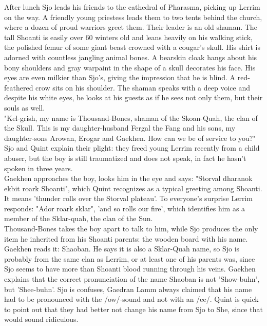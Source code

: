 After lunch Sjo leads his friends to the cathedral of Pharasma, picking up Lerrim on the way. A friendly young priestess leads them to two tents behind the church, where a dozen of proud warriors greet them. Their leader is an old shaman. The tall Shoanti is easily over 60 winters old and leans heavily on his walking stick, the polished femur of some giant beast crowned with a cougar's skull. His shirt is adorned with countless jangling animal bones. A bearskin cloak hangs about his bony shoulders and gray warpaint in the shape of a skull decorates his face. His eyes are even milkier than Sjo's, giving the impression that he is blind. A red-feathered crow sits on his shoulder. The shaman speaks with a deep voice and despite his white eyes, he looks at his guests as if he sees not only them, but their souls as well.\\

"Kel-grish, my name is Thousand-Bones, shaman of the Skoan-Quah, the clan of the Skull. This is my daughter-husband Fergal the Fang and his sons, my daughter-sons Arowan, Erogar and Gaekhen. How can we be of service to you?"\\

Sjo and Quint explain their plight: they freed young Lerrim recently from a child abuser, but the boy is still traumatized and does not speak, in fact he hasn't spoken in three years.\\

Gaekhen approaches the boy, looks him in the eye and says: "Storval dharanok ekbit roark Shoanti", which Quint recognizes as a typical greeting among Shoanti. It means 'thunder rolls over the Storval plateau'. To everyone's surprise Lerrim responds: "Ador roark sklar", 'and so rolls our fire', which identifies him as a member of the Sklar-quah, the clan of the Sun.\\

Thousand-Bones takes the boy apart to talk to him, while Sjo produces the only item he inherited from his Shoanti parents: the wooden board with his name. Gaekhen reads it: Shaoban. He says it is also a Sklar-Quah name, so Sjo is probably from the same clan as Lerrim, or at least one of his parents was, since Sjo seems to have more than Shoanti blood running through his veins. Gaekhen explains that the correct pronunciation of the name Shaoban is not 'Show-buhn', but 'Shee-buhn'. Sjo is confuses, Gaedran Lamm always claimed that his name had to be pronounced with the /ow/-sound and not with an /ee/. Quint is quick to point out that they had better not change his name from Sjo to She, since that would sound ridiculous.\\

